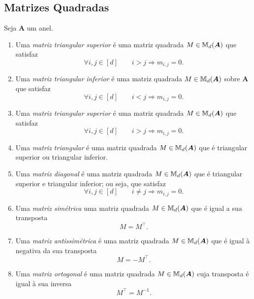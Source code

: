\subsection{Matrizes Quadradas}

\begin{defi}
	Seja $\bm A$ um anel.
	\begin{enumerate}
	\item Uma \emph{matriz triangular superior} é uma matriz quadrada $M \in \mathbb{M}_d(\bm A)$ que satisfaz
		\begin{equation*}
		\forall i,j \in [d] \qquad i > j \Rightarrow m_{i,j}=0.
		\end{equation*}
	\item Uma \emph{matriz triangular inferior} é uma matriz quadrada $M \in \mathbb{M}_d(\bm A)$ sobre $\bm A$ que satisfaz
		\begin{equation*}
		\forall i,j \in [d] \qquad i < j \Rightarrow m_{i,j}=0.
		\end{equation*}
	\item Uma \emph{matriz triangular superior} é uma matriz quadrada $M \in \mathbb{M}_d(\bm A)$ que satisfaz
		\begin{equation*}
		\forall i,j \in [d] \qquad i > j \Rightarrow m_{i,j}=0.
		\end{equation*}
	\item Uma \emph{matriz triangular} é uma matriz quadrada $M \in \mathbb{M}_d(\bm A)$ que é triangular superior ou triangular inferior.
	\item Uma \emph{matriz diagonal} é uma matriz quadrada $M \in \mathbb{M}_d(\bm A)$ que é triangular superior e triangular inferior; ou seja, que satisfaz
		\begin{equation*}
		\forall i,j \in [d] \qquad i \neq j \Rightarrow m_{i,j}=0.
		\end{equation*}
	\item Uma \emph{matriz simétrica}  uma matriz quadrada $M \in \mathbb{M}_d(\bm A)$ que é igual a sua transposta
		\begin{equation*}
		M = M^\intercal.
		\end{equation*}
	\item Uma \emph{matriz antissimétrica} é uma matriz quadrada $M \in \mathbb{M}_d(\bm A)$ que é igual à negativa da sua transposta
		\begin{equation*}
		M = -M^\intercal.
		\end{equation*}
	\item Uma \emph{matriz ortogonal} é uma matriz quadrada $M \in \mathbb{M}_d(\bm A)$ cuja transposta é igual à sua inversa
		\begin{equation*}
		M^\intercal = M^{-1}.
		\end{equation*}
	\end{enumerate}
\end{defi}

